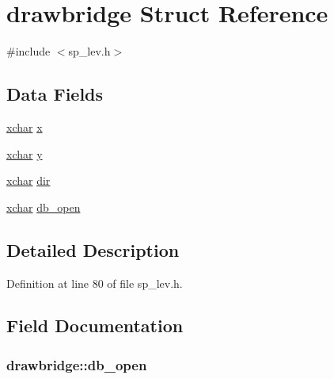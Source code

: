 \hypertarget{structdrawbridge}{\section{drawbridge Struct Reference}
\label{structdrawbridge}
}


{\ttfamily \#include $<$sp\+\_\+lev.\+h$>$}

\subsection*{Data Fields}
\begin{DoxyCompactItemize}
\item 
\hyperlink{global_8h_a2043b7d01ce89f4ee2fa6c345a752d32}{xchar} \hyperlink{structdrawbridge_a230d037c1c1042080df39dda677dd889}{x}
\item 
\hyperlink{global_8h_a2043b7d01ce89f4ee2fa6c345a752d32}{xchar} \hyperlink{structdrawbridge_a0916030cf787457a04c95cbbb7626f90}{y}
\item 
\hyperlink{global_8h_a2043b7d01ce89f4ee2fa6c345a752d32}{xchar} \hyperlink{structdrawbridge_a9ebf33f9dbeddea991e24bd689d54bdf}{dir}
\item 
\hyperlink{global_8h_a2043b7d01ce89f4ee2fa6c345a752d32}{xchar} \hyperlink{structdrawbridge_afe263ddd0e62b9588fb87940eb0621ae}{db\+\_\+open}
\end{DoxyCompactItemize}


\subsection{Detailed Description}


Definition at line 80 of file sp\+\_\+lev.\+h.



\subsection{Field Documentation}
\hypertarget{structdrawbridge_afe263ddd0e62b9588fb87940eb0621ae}{
\subsubsection[{db\+\_\+open}]{ drawbridge\+::db\+\_\+open}}\label{structdrawbridge_afe263ddd0e62b9588fb87940eb0621ae}


